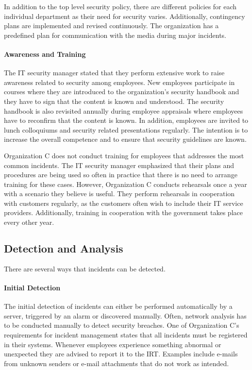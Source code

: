 In addition to the top level security policy, there are different policies for each individual department as their need for security varies. Additionally, contingency plans are implemented and revised continuously. The organization has a predefined plan for communication with the media during major incidents. 

\paragraph{Awareness and Training}
The IT security manager stated that they perform extensive work to raise awareness related to security among employees. New employees participate in courses where they are introduced to the organization's security handbook and they have to sign that the content is known and understood. The security handbook is also revisited annually during employee appraisals where employees have to reconfirm that the content is known. In addition, employees are invited to lunch colloquiums and security related presentations regularly. The intention is to increase the overall competence and to ensure that security guidelines are known.

Organization C does not conduct training for employees that addresses the most common incidents. The IT security manager emphasized that their plans and procedures are being used so often in practice that there is no need to arrange training for these cases. However, Organization C conducts rehearsals once a year with a scenario they believe is useful. They perform rehearsals in cooperation with customers regularly, as the customers often wish to include their IT service providers. Additionally, training in cooperation with the government takes place every other year. 

\subsection{Detection and Analysis}
There are several ways that incidents can be detected.
\paragraph{Initial Detection}
The initial detection of incidents can either be performed automatically by a server, triggered by an alarm or discovered manually. Often, network analysis has to be conducted manually to detect security breaches. One of Organization C's requirements for incident management states that all incidents must be registered in their systems. Whenever employees experience something abnormal or unexpected they are advised to report it to the \ac{IRT}. Examples include e-mails from unknown senders or e-mail attachments that do not work as intended.

